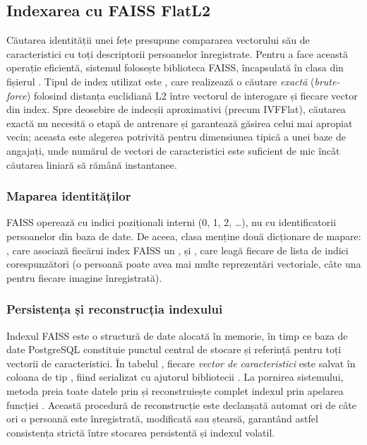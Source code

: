 \documentclass[../../main.tex]{subfiles}
\begin{document}
\subsection{Indexarea cu FAISS FlatL2}
\label{subsec:indexare_faiss}

Căutarea identității unei fețe presupune compararea vectorului său de caracteristici cu toți
descriptorii persoanelor înregistrate. Pentru a face această operație eficientă,
sistemul folosește biblioteca FAISS, încapsulată în clasa 
din fișierul . Tipul de index utilizat este
, care realizează o căutare \textit{exactă} (\textit{brute-force})
folosind distanța euclidiană L2 între vectorul de interogare și fiecare vector din
index. Spre deosebire de indecșii aproximativi (precum IVFFlat), căutarea exactă nu
necesită o etapă de antrenare și garantează găsirea celui mai apropiat vecin; aceasta
este alegerea potrivită pentru dimensiunea tipică a unei baze de angajați, unde numărul
de vectori de caracteristici este suficient de mic încât căutarea liniară să rămână instantanee.

\subsubsection{Maparea identităților}
FAISS operează cu indici poziționali interni (0, 1, 2, \dots), nu cu identificatorii
persoanelor din baza de date. De aceea, clasa  menține două
dicționare de mapare: , care asociază fiecărui index FAISS un
, și , care leagă fiecare
 de lista de indici corespunzători (o persoană poate avea mai
multe reprezentări vectoriale, câte una pentru fiecare imagine înregistrată).

\subsubsection{Persistența și reconstrucția indexului}
Indexul FAISS este o structură de date alocată în memorie, în timp ce baza de date PostgreSQL constituie punctul central de stocare și referință pentru toți vectorii de caracteristici. În tabelul , fiecare \emph{vector de caracteristici} este salvat în coloana  de tip , fiind serializat cu ajutorul bibliotecii . La pornirea sistemului, metoda   preia toate datele prin  și reconstruiește complet indexul prin apelarea funcției . Această procedură de reconstrucție este declanșată automat ori de câte ori o persoană este înregistrată, modificată sau ștearsă, garantând astfel consistența strictă între stocarea persistentă și indexul volatil. 
\end{document}
